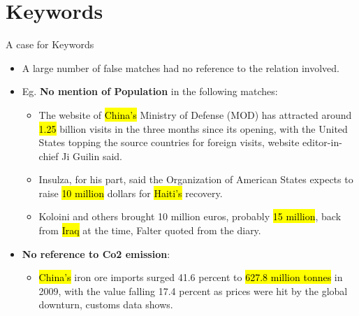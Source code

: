 \documentclass{beamer}
\makeatletter
\newcommand\SoulColor{%
  \let\set@color\beamerorig@set@color
  \let\reset@color\beamerorig@reset@color}
\makeatother
\begin{document}
\section{Keywords}
\begin{frame}{A case for Keywords}
 \begin{itemize}
  \item A large number of false matches had no reference to the relation involved.
  \item Eg. \textbf{No mention of Population} in the following matches:
  \begin{itemize}
  \item The website of \SoulColor\hl{China's} Ministry of Defense (MOD) has attracted around \SoulColor\hl{1.25} billion visits in the three months since its opening, with the United States topping the source countries for foreign visits, website editor-in-chief Ji Guilin said.
  \item Insulza, for his part, said the Organization of American States expects to raise \SoulColor\hl{10 million} dollars for \SoulColor\hl{Haiti's} recovery.
  \item Koloini and others brought 10 million euros, probably \SoulColor\hl{15 million}, back from \SoulColor\hl{Iraq} at the time, Falter quoted from the diary.
 \end{itemize}
\item \textbf{No reference to Co2 emission}:
 \begin{itemize}
 \item \SoulColor\hl{China's} iron ore imports surged 41.6 percent to \SoulColor\hl{627.8 million tonnes} in 2009, with the value falling 17.4 percent as prices were hit by the global downturn, customs data shows.
 \end{itemize}
 \end{itemize}
\end{frame}
\end{document}
